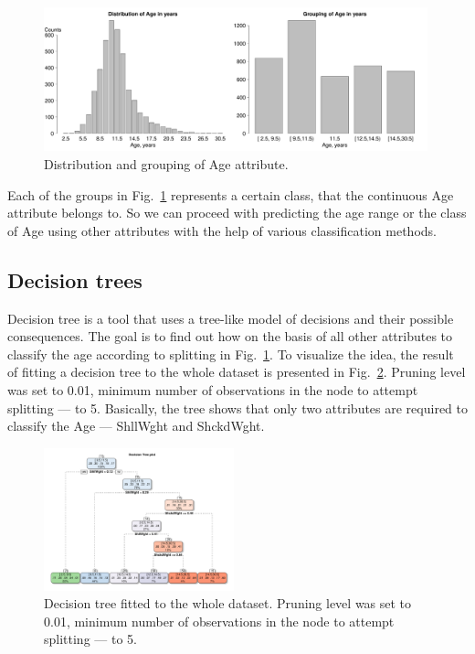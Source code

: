 \documentclass[10pt, paper=a4]{article}
\begin{document}
\begin{figure}[htbp]
  \centering
  \includegraphics[width = 0.99\textwidth]{age_grouping.pdf}
  \caption{Distribution and grouping of Age attribute.}
  \label{fig:age_grouping}
\end{figure}

Each of the groups in Fig.~\ref{fig:age_grouping} represents a certain
class, that the continuous Age attribute belongs to.  So we can
proceed with predicting the age range or the class of Age using other
attributes with the help of various classification methods.

\subsection{Decision trees}
Decision tree is a tool that uses a tree-like model of decisions and
their possible consequences.  The goal is to find out how on the basis
of all other attributes to classify the age according to splitting in
Fig.~\ref{fig:age_grouping}.  To visualize the idea, the result of
fitting a decision tree to the whole dataset is presented in
Fig.~\ref{fig:decision_tree}.  Pruning level was set to 0.01, minimum
number of observations in the node to attempt splitting --- to 5.
Basically, the tree shows that only two attributes are required to
classify the Age --- ShllWght and ShckdWght.

\begin{figure}[htbp]
  \centering
  \includegraphics[width = 0.49\textwidth]{decision_tree.pdf}
  \caption{Decision tree fitted to the whole dataset.  Pruning level
    was set to 0.01, minimum number of observations in the node to
    attempt splitting --- to 5.}
  \label{fig:decision_tree}
\end{figure}
\end{document}
